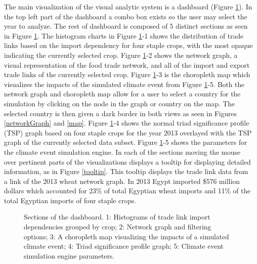 		The main visualization of the visual analytic system is a dashboard (Figure \ref{dashboardSections}). In the top left part of the dashboard a combo box exists so the user may select the year to analyze. The rest of dashboard is composed of 5 distinct sections as seen in Figure \ref{dashboardSections}. The histogram charts in Figure \ref{dashboardSections}-1 shows the distribution of trade links based on the import dependency for four staple crops, with the most opaque indicating the currently selected crop. Figure \ref{dashboardSections}-2 shows the network graph, a visual representation of the food trade network, and all of the import and export trade links of the currently selected crop. Figure \ref{dashboardSections}-3 is the choropleth map which visualizes the impacts of the simulated climate event from Figure \ref{dashboardSections}-5. Both the network graph and choropleth map allow for a user to select a country for the simulation by clicking on the node in the graph or country on the map. The selected country is then given a dark border in both views as seen in Figures \ref{networkGraph} and \ref{map}. Figure \ref{dashboardSections}-4 shows the normal triad significance profile (TSP) graph based on four staple crops for the year 2013 overlayed with the TSP graph of the currently selected data subset. Figure \ref{dashboardSections}-5 shows the parameters for the climate event simulation engine. In each of the sections moving the mouse over pertinent parts of the visualizations displays a tooltip for displaying detailed information, as in Figure \ref{tooltip}. This tooltip displays the trade link data from a link of the 2013 wheat network graph. In 2013 Egypt imported \$576 million dollars which accounted for 23\% of total Egyptian wheat imports and 11\% of the total Egyptian imports of four staple crops.\par
		\begin{figure}[htb]
			\caption[SECTIONS OF THE DASHBOARD]{Sections of the dashboard. 1: Histograms of trade link import dependencies grouped by crop; 2: Network graph and filtering options; 3: A choropleth map visualizing the impacts of a simulated climate event; 4: Triad significance profile graph; 5: Climate event simulation engine parameters.}
			\label{dashboardSections}
		\end{figure}
